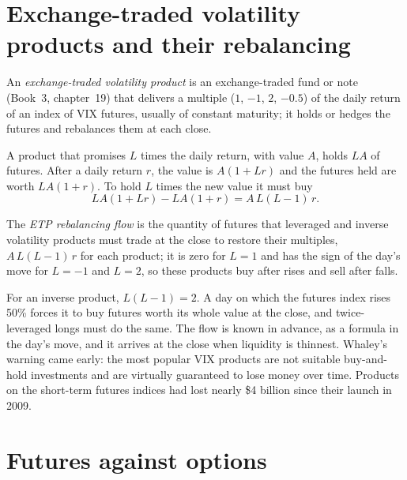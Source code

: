 \section{Exchange-traded volatility products and their rebalancing}

\begin{definition}\label{def:s2:the-volatility-index-complex:etp}
An \emph{exchange-traded volatility product} is an exchange-traded fund or note (Book~3, chapter~19) that
delivers a multiple ($1$, $-1$, $2$, $-0.5$) of the daily return of an index of VIX futures, usually of constant maturity; it holds or hedges the
futures and rebalances them at each close.
\end{definition}

A product that promises $L$ times the daily return, with value $A$, holds $LA$ of futures. After a daily return $r$, the value is $A(1 + Lr)$ and the
futures held are worth $LA(1 + r)$. To hold $L$ times the new value it must buy
\[
LA(1 + Lr) - LA(1 + r) = A\,L(L - 1)\,r.
\]

\begin{definition}\label{def:s2:the-volatility-index-complex:flow}
The \emph{ETP rebalancing flow} is the quantity of futures that leveraged and inverse volatility products must trade at
the close to restore their multiples, $A\,L(L - 1)\,r$ for each product; it is zero for $L = 1$ and has the sign of the day's move for $L = -1$ and
$L = 2$, so these products buy after rises and sell after falls.
\end{definition}

For an inverse product, $L(L - 1) = 2$. A day on which the futures index rises 50\% forces it to buy futures worth its whole value at the close, and
twice-leveraged longs must do the same. The flow is known in advance, as a formula in the day's move, and it arrives at the close when liquidity is
thinnest. Whaley's warning came early: the most popular VIX products are not suitable buy-and-hold investments and are virtually guaranteed to lose
money over time. Products on the short-term futures indices had lost nearly \$4 billion since their launch in 2009.

\section{Futures against options}

